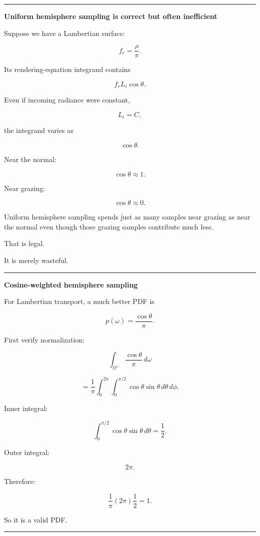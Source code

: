 \begin{center}\rule{0.5\linewidth}{0.5pt}\end{center}

\textbf{Uniform hemisphere sampling is correct but often inefficient}

Suppose we have a Lambertian surface:

\[
f_r=\frac{\rho}{\pi}.
\]

Its rendering-equation integrand contains

\[
f_rL_i\cos\theta.
\]

Even if incoming radiance were constant,

\[
L_i=C,
\]

the integrand varies as

\[
\cos\theta.
\]

Near the normal:

\[
\cos\theta\approx1.
\]

Near grazing:

\[
\cos\theta\approx0.
\]

Uniform hemisphere sampling spends just as many samples near grazing as near the normal even though those grazing samples contribute much less.

That is legal.

It is merely wasteful.

\begin{center}\rule{0.5\linewidth}{0.5pt}\end{center}

\textbf{Cosine-weighted hemisphere sampling}

For Lambertian transport, a much better PDF is

\[
\boxed{
p(\omega)
=
\frac{\cos\theta}{\pi}.
}
\]

First verify normalization:

\[
\int_{\Omega^+}
\frac{\cos\theta}{\pi}
\,d\omega
\]

\[
=
\frac1\pi
\int_0^{2\pi}
\int_0^{\pi/2}
\cos\theta
\sin\theta
\,d\theta\,d\phi.
\]

Inner integral:

\[
\int_0^{\pi/2}
\cos\theta\sin\theta\,d\theta
=
\frac12.
\]

Outer integral:

\[
2\pi.
\]

Therefore:

\[
\frac1\pi
(2\pi)
\frac12
=
1.
\]

So it is a valid PDF.

\begin{center}\rule{0.5\linewidth}{0.5pt}\end{center}

